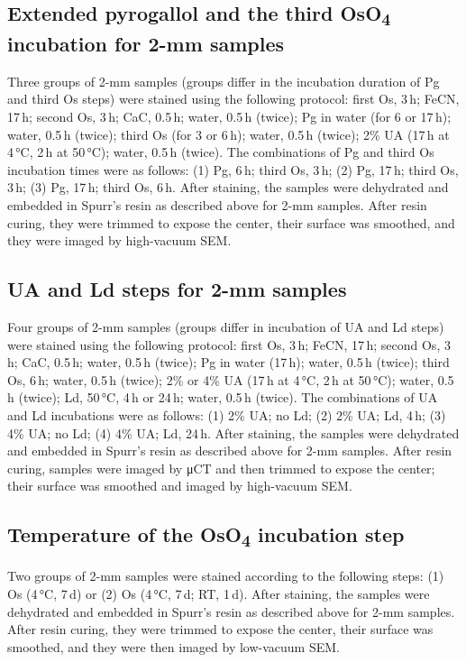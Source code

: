 \documentclass{article}
\begin{document}
\subsection*{Extended pyrogallol and the third OsO\textsubscript{4} incubation for 2-mm samples}
Three groups of 2-mm samples (groups differ in the incubation duration of Pg and third Os steps) were stained using the following protocol: first Os, 3\,h; FeCN, 17\,h; second Os, 3\,h; CaC, 0.5\,h; water, 0.5\,h (twice); Pg in water (for 6 or 17\,h); water, 0.5\,h (twice); third Os (for 3 or 6\,h); water, 0.5\,h (twice); 2\% UA (17\,h at 4\,°C, 2\,h at 50\,°C); water, 0.5\,h (twice). The combinations of Pg and third Os incubation times were as follows: (1) Pg, 6\,h; third Os, 3\,h; (2) Pg, 17\,h; third Os, 3\,h; (3) Pg, 17\,h; third Os, 6\,h. After staining, the samples were dehydrated and embedded in Spurr’s resin as described above for 2-mm samples. After resin curing, they were trimmed to expose the center, their surface was smoothed, and they were imaged by high-vacuum SEM.

\subsection*{UA and Ld steps for 2-mm samples}
Four groups of 2-mm samples (groups differ in incubation of UA and Ld steps) were stained using the following protocol: first Os, 3\,h; FeCN, 17\,h; second Os, 3\,h; CaC, 0.5\,h; water, 0.5\,h (twice); Pg in water (17\,h); water, 0.5\,h (twice); third Os, 6\,h; water, 0.5\,h (twice); 2\% or 4\% UA (17\,h at 4\,°C, 2\,h at 50\,°C); water, 0.5\,h (twice); Ld, 50\,°C, 4\,h or 24\,h; water, 0.5\,h (twice). The combinations of UA and Ld incubations were as follows: (1) 2\% UA; no Ld; (2) 2\% UA; Ld, 4\,h; (3) 4\% UA; no Ld; (4) 4\% UA; Ld, 24\,h. After staining, the samples were dehydrated and embedded in Spurr’s resin as described above for 2-mm samples. After resin curing, samples were imaged by μCT and then trimmed to expose the center; their surface was smoothed and imaged by high-vacuum SEM.

\subsection*{Temperature of the OsO\textsubscript{4} incubation step}
Two groups of 2-mm samples were stained according to the following steps: (1) Os (4\,°C, 7\,d) or (2) Os (4\,°C, 7\,d; RT, 1\,d). After staining, the samples were dehydrated and embedded in Spurr’s resin as described above for 2-mm samples. After resin curing, they were trimmed to expose the center, their surface was smoothed, and they were then imaged by low-vacuum SEM.
\end{document}
